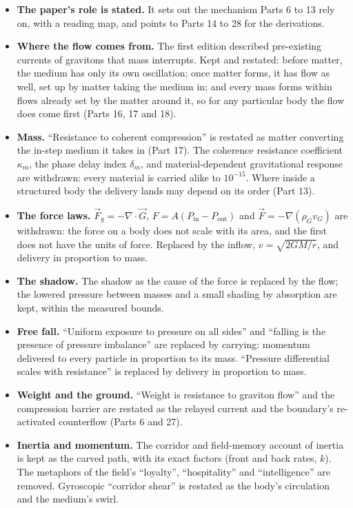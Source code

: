 \documentclass[11pt,a4paper]{article}
\begin{document}
\begin{itemize}
\item \textbf{The paper's role is stated.} It sets out the mechanism Parts 6 to 13 rely on, with a reading map, and points to Parts 14 to 28 for the derivations.
\item \textbf{Where the flow comes from.} The first edition described pre-existing currents of gravitons that mass interrupts. Kept and restated: before matter, the medium has only its own oscillation; once matter forms, it has flow as well, set up by matter taking the medium in; and every mass forms within flows already set by the matter around it, so for any particular body the flow does come first (Parts 16, 17 and 18).
\item \textbf{Mass.} ``Resistance to coherent compression'' is restated as matter converting the in-step medium it takes in (Part 17). The coherence resistance coefficient $\kappa_m$, the phase delay index $\delta_m$, and material-dependent gravitational response are withdrawn: every material is carried alike to $10^{-15}$. Where inside a structured body the delivery lands may depend on its order (Part 13).
\item \textbf{The force laws.} $\vec F_g = -\nabla\cdot\vec G$, $F = A(P_\text{in} - P_\text{out})$ and $\vec F = -\nabla(\rho_G v_G)$ are withdrawn: the force on a body does not scale with its area, and the first does not have the units of force. Replaced by the inflow, $v = \sqrt{2GM/r}$, and delivery in proportion to mass.
\item \textbf{The shadow.} The shadow as the cause of the force is replaced by the flow; the lowered pressure between masses and a small shading by absorption are kept, within the measured bounds.
\item \textbf{Free fall.} ``Uniform exposure to pressure on all sides'' and ``falling is the presence of pressure imbalance'' are replaced by carrying: momentum delivered to every particle in proportion to its mass. ``Pressure differential scales with resistance'' is replaced by delivery in proportion to mass.
\item \textbf{Weight and the ground.} ``Weight is resistance to graviton flow'' and the compression barrier are restated as the relayed current and the boundary's re-activated counterflow (Parts 6 and 27).
\item \textbf{Inertia and momentum.} The corridor and field-memory account of inertia is kept as the carved path, with its exact factors (front and back rates, $k$). The metaphors of the field's ``loyalty'', ``hospitality'' and ``intelligence'' are removed. Gyroscopic ``corridor shear'' is restated as the body's circulation and the medium's swirl.

\end{itemize}
\end{document}
